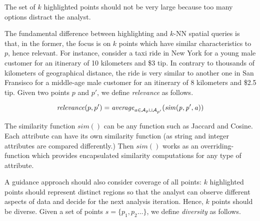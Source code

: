 \vspace{5pt}
 The set of $k$ highlighted points should not be very large because too many options distract the analyst. %

\vspace{5pt}
 The fundamental difference between highlighting and $k$-NN spatial queries \cite{aly2015spatial} is that, in the former, the focus is on $k$ points which have similar characteristics to~$p$, hence relevant.
For instance, consider a taxi ride in New York for a young male customer for an itinerary of 10 kilometers and \$3 tip. In contrary to thousands of kilometers of geographical distance, the ride is very similar to another one in San Fransisco for a middle-age male customer for an itinerary of 8 kilometers and \$2.5 tip.
Given two points $p$ and $p'$, we define {\em relevance} as follows.


\begin{dmath}
\label{eq:rel}
\mathit{relevance}(p,p') = \mathit{average}_{a \in {\cal A}_{p} \cup {\cal A}_{p'}}(\mathit{sim(p, p', a)})
\end{dmath}

The similarity function $\mathit{sim}()$ can be any function such as Jaccard and Cosine. Each attribute can have its own similarity function (as string and integer attributes are compared differently.) Then $\mathit{sim}()$ works as an overriding-function which provides encapsulated similarity computations for any type of attribute.

\vspace{5pt}
 A guidance approach should also consider coverage of all points: $k$ highlighted points should represent distinct regions so that the analyst can observe different aspects of data and decide for the next analysis iteration. Hence, $k$ points should be diverse.
Given a set of points $s = \{ p_1, p_2 \dots \}$, we define {\em diversity} as follows.

